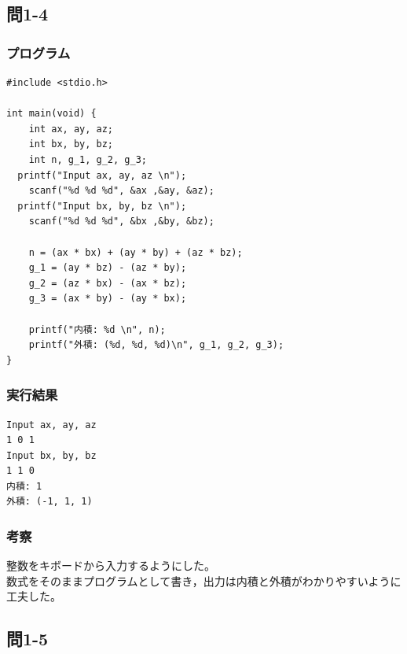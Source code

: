 \documentclass{jarticle}
\begin{document}
\subsection{問1-4\\}
\subsubsection{プログラム\\}
\begin{breakbox}
\begin{verbatim}
#include <stdio.h>

int main(void) {
	int ax, ay, az;
	int bx, by, bz;
	int n, g_1, g_2, g_3;
  printf("Input ax, ay, az \n");
	scanf("%d %d %d", &ax ,&ay, &az);
  printf("Input bx, by, bz \n");
	scanf("%d %d %d", &bx ,&by, &bz);
  
	n = (ax * bx) + (ay * by) + (az * bz); 
	g_1 = (ay * bz) - (az * by); 
	g_2 = (az * bx) - (ax * bz); 
	g_3 = (ax * by) - (ay * bx);

	printf("内積: %d \n", n);
	printf("外積: (%d, %d, %d)\n", g_1, g_2, g_3); 
}
\end{verbatim}
\end{breakbox}
\subsubsection{実行結果\\}
\begin{breakbox}
\begin{verbatim}
Input ax, ay, az 
1 0 1
Input bx, by, bz 
1 1 0
内積: 1 
外積: (-1, 1, 1)
\end{verbatim}
\end{breakbox}
\subsubsection{考察\\}
整数をキボードから入力するようにした。\\
数式をそのままプログラムとして書き，出力は内積と外積がわかりやすいように工夫した。\\


\subsection{問1-5\\}
\end{document}
